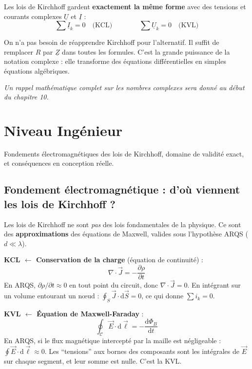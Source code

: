 \documentclass[12pt,a4paper,twoside]{book}
\begin{document}
Les lois de Kirchhoff gardent \textbf{exactement la même forme} avec des tensions et courants complexes $\underline{U}$ et $\underline{I}$ :
\[
\sum \underline{I}_k = 0 \quad \text{(KCL)} \qquad\qquad \sum \underline{U}_k = 0 \quad \text{(KVL)}
\]

\begin{intuition}
On n'a pas besoin de réapprendre Kirchhoff pour l'alternatif. Il suffit de remplacer $R$ par $\underline{Z}$ dans toutes les formules. C'est la grande puissance de la notation complexe : elle transforme des équations différentielles en simples équations algébriques.

\textit{Un rappel mathématique complet sur les nombres complexes sera donné au début du chapitre 10.}
\end{intuition}

\section{Niveau Ingénieur}

\begin{ingenieur}
Fondements électromagnétiques des lois de Kirchhoff, domaine de validité exact, et conséquences en conception réelle.
\end{ingenieur}

\subsection{Fondement électromagnétique : d'où viennent les lois de Kirchhoff ?}

Les lois de Kirchhoff ne sont \textit{pas} des lois fondamentales de la physique. Ce sont des \textbf{approximations} des équations de Maxwell, valides sous l'hypothèse ARQS ($d \ll \lambda$).

\textbf{KCL $\leftarrow$ Conservation de la charge} (équation de continuité) :
\[
\nabla \cdot \vec{J} = -\frac{\partial \rho}{\partial t}
\]
En ARQS, $\partial\rho/\partial t \approx 0$ en tout point du circuit, donc $\nabla\cdot\vec{J} = 0$. En intégrant sur un volume entourant un n\oe ud : $\oint_S \vec{J}\cdot\mathrm{d}\vec{S} = 0$, ce qui donne $\sum i_k = 0$.

\textbf{KVL $\leftarrow$ Équation de Maxwell-Faraday} :
\[
\oint_{\mathcal{C}} \vec{E}\cdot\mathrm{d}\vec{\ell} = -\frac{\mathrm{d}\Phi_B}{\mathrm{d}t}
\]
En ARQS, si le flux magnétique intercepté par la maille est négligeable : $\oint \vec{E}\cdot\mathrm{d}\vec{\ell} \approx 0$. Les ``tensions'' aux bornes des composants sont les intégrales de $\vec{E}$ sur chaque segment, et leur somme est nulle. C'est la KVL.
\end{document}
